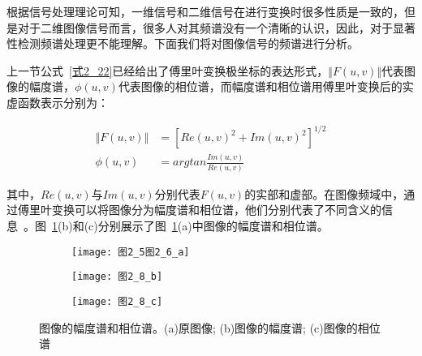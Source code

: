 根据信号处理理论可知，一维信号和二维信号在进行变换时很多性质是一致的，但是对于二维图像信号而言，很多人对其频谱没有一个清晰的认识，因此，对于显著性检测频谱处理更不能理解。下面我们将对图像信号的频谱进行分析。

上一节公式~\ref{式2_22}已经给出了傅里叶变换极坐标的表达形式，$\Vert F(u,v)\Vert$代表图像的幅度谱，$\phi(u,v)$代表图像的相位谱，而幅度谱和相位谱用傅里叶变换后的实虚函数表示分别为：
\begin{linenomath}
\begin{align}
\Vert F(u,v)\Vert &= [Re(u,v)^{2}+Im(u,v)^{2}]^{1/2}\label{式2_35}\\
\phi(u,v) &= arg tan\frac{Im(u,v)}{Re(u,v)}\label{式2_36}
\end{align}
\end{linenomath}
其中，$Re(u,v)$与$Im(u,v)$分别代表$F(u,v)$的实部和虚部。在图像频域中，通过傅里叶变换可以将图像分为幅度谱和相位谱，他们分别代表了不同含义的信息~\cite{ZhangRuolan2002frequency}。图~\ref{图2_8}(b)和(c)分别展示了图~\ref{图2_8}(a)中图像的幅度谱和相位谱。
\begin{figure}[h]
  \centering%
  \begin{subfigure}{3cm}
    \texttt{[image: 图2\_5图2\_6\_a]}
    \caption{}
  \end{subfigure}
  \hspace{4em}%
  \begin{subfigure}{0.2\textwidth}
    \texttt{[image: 图2\_8\_b]}
    \caption{}
  \end{subfigure}
  \hspace{4em}%
  \begin{subfigure}{0.25\textwidth}
    \texttt{[image: 图2\_8\_c]}
    \caption{}
  \end{subfigure}
  \caption{图像的幅度谱和相位谱。(a)原图像; (b)图像的幅度谱; (c)图像的相位谱}
  \label{图2_8}
\end{figure}

